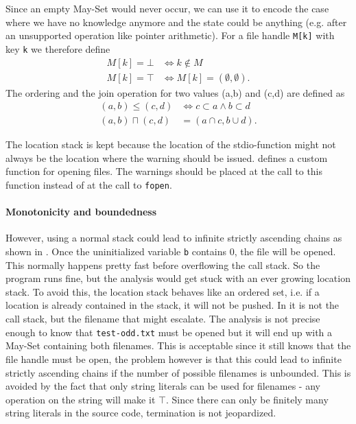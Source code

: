 Since an empty May-Set would never occur, we can use it to encode the case where we have no knowledge anymore and the state could be anything (e.g. after an unsupported operation like pointer arithmetic).
For a file handle \verb|M[k]| with key \verb|k| we therefore define 
\begin{align}
M[k] = \bot &\Leftrightarrow k \notin M\\
M[k] = \top &\Leftrightarrow M[k] = (\emptyset, \emptyset).
\end{align}
The ordering and the join operation for two values (a,b) and (c,d) are defined as
\begin{align}
(a,b) \leq (c,d) &\Leftrightarrow c \subset a \wedge b \subset d\\
(a,b) \sqcap (c,d) &= (a \cap c, b \cup d).
\end{align}

The location stack is kept because the location of the stdio-function might not always be the location where the warning should be issued.  defines a custom function for opening files. The warnings should be placed at the call to this function instead of at the call to \verb|fopen|.

\paragraph*{Monotonicity and boundedness}
However, using a normal stack could lead to infinite strictly ascending chains as shown in . Once the uninitialized variable \verb|b| contains 0, the file will be opened. This normally happens pretty fast before overflowing the call stack. So the program runs fine, but the analysis would get stuck with an ever growing location stack. To avoid this, the location stack behaves like an ordered set, i.e. if a location is already contained in the stack, it will not be pushed. %
In  it is not the call stack, but the filename that might escalate. The analysis is not precise enough to know that \verb|test-odd.txt| must be opened but it will end up with a May-Set containing both filenames. This is acceptable since it still knows that the file handle must be open, the problem however is that this could lead to infinite strictly ascending chains if the number of possible filenames is unbounded. This is avoided by the fact that only string literals can be used for filenames - any operation on the string will make it $\top$. Since there can only be finitely many string literals in the source code, termination is not jeopardized.


